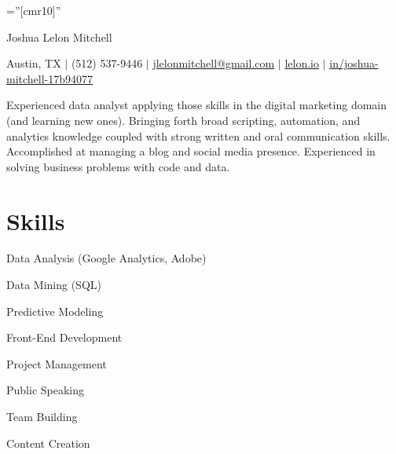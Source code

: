 \documentclass[a4paper,10pt]{article}
\begin{document}

\pagestyle{empty} %

\font\fb=''[cmr10]'' %

\par{\centering
		{\Huge Joshua Lelon Mitchell
	}\par}
\par{\centering
		{
	Austin, TX
	$\mid$
	(512) 537-9446
	$\mid$
	\href {mailto:jlelonmitchell@gmail.com}{jlelonmitchell@gmail.com}
	$\mid$
	\href {https://lelon.io/}{lelon.io}
	$\mid$
	\href {https://www.linkedin.com/in/joshua-mitchell-17b94077/}{in/joshua-mitchell-17b94077}
}\par}

\begin{center}
	Experienced data analyst applying those skills in the digital marketing domain (and learning new ones). Bringing forth broad scripting, automation, and analytics knowledge coupled with strong written and oral communication skills. Accomplished at managing a blog and social media presence. Experienced in solving business problems with code and data. 
\end{center}

\section{Skills}

\begin{multicols}{2}
	Data Analysis (Google Analytics, Adobe)
	
	Data Mining (SQL)
	
	Predictive Modeling
	
	Front-End Development
	
	\columnbreak
	
	Project Management
	
	Public Speaking
	
	Team Building
	
	Content Creation
\end{multicols}
\end{document}
